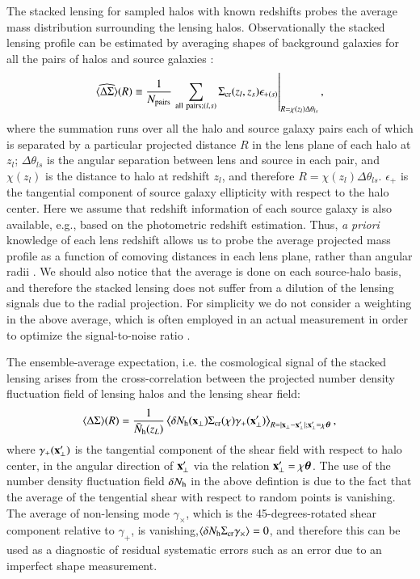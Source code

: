 \documentclass[onecolumn,notitlepage,showpacs,amsmath,amssymb,prd,floatfix]{revtex4-1}
\def\ave#1{\left\langle #1 \right\rangle}
\newcommand{\bx}{{\bf x}}
\newcommand{\btheta}{{\bm{\theta}}}
\newcommand{\sigmacr}{\Sigma_{\rm cr}}
\newcommand{\bNh}{\bar{N}_{\rm h}}
\newcommand{\dsigma}{\Delta\Sigma}
\begin{document}
The stacked lensing for sampled halos with known redshifts probes the
average mass distribution surrounding the lensing halos. Observationally
the stacked lensing profile can be estimated by averaging shapes of
background galaxies for all the pairs of halos and source galaxies
\cite{Miyatakeetal:15,Niikuraetal:15}:
%
\begin{equation}
 \widehat{\ave{\dsigma}}(R)\equiv\frac{1}{N_{\rm pairs}}
	\left.\sum_{{\rm all~ pairs}; (l,s)}\sigmacr(z_{l},z_s)\epsilon_{+(s)}
	\right|_{R=\chi(z_{l})\Delta\theta_{ls}},
\end{equation}
%
where the summation runs over all the halo and source galaxy pairs each
of which is separated by a particular projected distance $R$ in the lens
plane of each halo at $z_l$; $\Delta\theta_{ls}$ is the angular
separation between lens and source in each pair, and $\chi(z_l)$ is the
distance to halo at redshift $z_l$, and therefore
$R=\chi(z_l)\Delta\theta_{ls}$. $\epsilon_+$ is the tangential component
of source galaxy ellipticity with respect to the halo center.  Here we
assume that redshift information of each source galaxy is also
available, e.g., based on the photometric redshift estimation.  Thus,
{\em a priori} knowledge of each lens redshift allows us to probe the
average projected mass profile as a function of comoving distances in
each lens plane, rather than angular radii
\cite{Hikageetal:13,Nishizawaetal:13}.  We should also notice that the
average is done on each source-halo basis, and therefore the stacked
lensing does not suffer from a dilution of the lensing signals due to
the radial projection.  For simplicity we do not consider a weighting in
the above average, which is often employed in an actual measurement in
order to optimize the signal-to-noise ratio
\citep[e.g.,][]{Miyatakeetal:15}.

The ensemble-average expectation, i.e. the cosmological signal of the
stacked lensing arises from the cross-correlation between the projected
number density fluctuation field of lensing halos and the lensing shear
field:
%
\begin{equation}
{\ave{\dsigma}}(R)=\frac{1}{\bNh(z_L)}
  \ave{\delta N_{\rm h}(\bx_\perp)\sigmacr(\chi)
  \gamma_{+}(\bx'_\perp)}_{R=|\bx_\perp-\bx'_\perp|;\bx'_\perp=\chi\btheta},
  \label{eq:e_dsigma}
\end{equation}
%
where $\gamma_+(\bx_\perp^{\prime})$ is the tangential component of the
shear field with respect to halo center, in the angular direction of
$\bx_\perp^{\prime}$ via the relation $\bx_\perp^{\prime}=\chi\btheta$.
The use of the number density fluctuation field $\delta N_{\rm h}$ in
the above defintion is due to the fact that the average of the
tengential shear with respect to random points is vanishing.  The
average of non-lensing mode $\gamma_\times$, which is the
45-degrees-rotated shear component relative to $\gamma_+$, is
vanishing,$\ave{\delta N_{\rm h}\sigmacr \gamma_\times}=0$, and
therefore this can be used as a diagnostic of residual systematic errors
such as an error due to an imperfect shape measurement.
\end{document}
